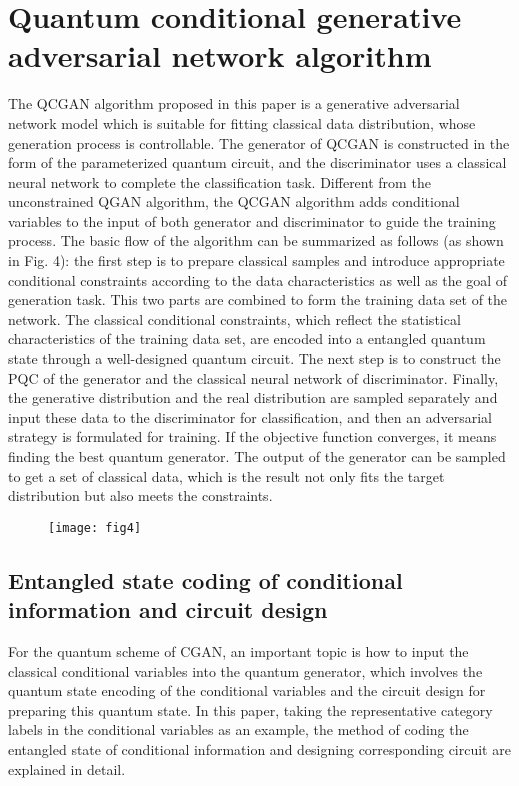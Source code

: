 \documentclass{bmcart}
\begin{document}
\section{Quantum conditional generative adversarial network algorithm}
The QCGAN algorithm proposed in this paper is a generative adversarial network model which is suitable for fitting classical data distribution, whose generation process is controllable. The generator of QCGAN is constructed in the form of the parameterized quantum circuit, and the discriminator uses a classical neural network to complete the classification task. Different from the unconstrained QGAN algorithm, the QCGAN algorithm adds conditional variables to the input of both generator and discriminator to guide the training process. The basic flow of the algorithm can be summarized as follows (as shown in Fig. 4): the first step is to prepare classical samples and introduce appropriate conditional constraints according to the data characteristics as well as the goal of generation task. This two parts are combined to form the training data set of the network. The classical conditional constraints, which reflect the statistical characteristics of the training data set, are encoded into a entangled quantum state through a well-designed quantum circuit. The next step is to construct the PQC of the generator and the classical neural network of discriminator. Finally, the generative distribution and the real distribution are sampled separately and input these data to the discriminator for classification, and then an adversarial strategy is formulated for training. If the objective function converges, it means finding the best quantum generator. The output of the generator can be sampled to get a set of classical data, which is the result not only fits the target distribution but also meets the constraints.

  \begin{figure}[h!]
  \texttt{[image: fig4]}
  \caption{}
  \end{figure}

\subsection{Entangled state coding of conditional information and circuit design}
For the quantum scheme of CGAN, an important topic is how to input the classical conditional variables into the quantum generator, which involves the quantum state encoding of the conditional variables and the circuit design for preparing this quantum state. In this paper, taking the representative category labels in the conditional variables as an example, the method of coding the entangled state of conditional information and designing corresponding circuit are explained in detail.
\end{document}

